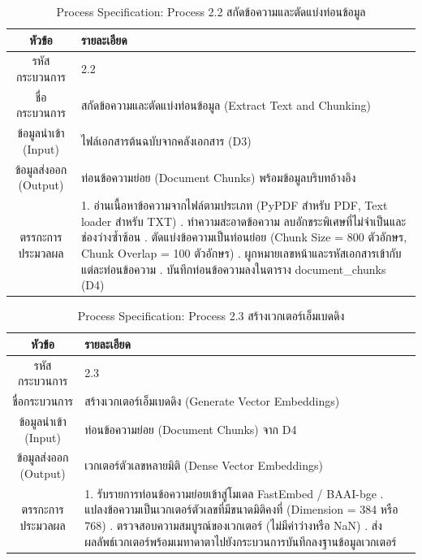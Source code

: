 \begin{table}[htbp]
\centering
\caption{Process Specification: Process 2.2 สกัดข้อความและตัดแบ่งท่อนข้อมูล}
\label{tab3:pspec2_2}
\begin{tabularx}{\textwidth}{| c | L |}
\hline
\textbf{หัวข้อ} & \textbf{รายละเอียด} \\ \hline
รหัสกระบวนการ & 2.2 \\ \hline
ชื่อกระบวนการ & สกัดข้อความและตัดแบ่งท่อนข้อมูล (Extract Text and Chunking) \\ \hline
ข้อมูลนำเข้า (Input) & ไฟล์เอกสารต้นฉบับจากคลังเอกสาร (D3) \\ \hline
ข้อมูลส่งออก (Output) & ท่อนข้อความย่อย (Document Chunks) พร้อมข้อมูลบริบทอ้างอิง \\ \hline
ตรรกะการประมวลผล & 1. อ่านเนื้อหาข้อความจากไฟล์ตามประเภท (PyPDF สำหรับ PDF, Text loader สำหรับ TXT) . ทำความสะอาดข้อความ ลบอักขระพิเศษที่ไม่จำเป็นและช่องว่างซ้ำซ้อน . ตัดแบ่งข้อความเป็นท่อนย่อย (Chunk Size = 800 ตัวอักษร, Chunk Overlap = 100 ตัวอักษร) . ผูกหมายเลขหน้าและรหัสเอกสารเข้ากับแต่ละท่อนข้อความ . บันทึกท่อนข้อความลงในตาราง document\_chunks (D4) \\ \hline
\end{tabularx}
\end{table}

\begin{table}[htbp]
\centering
\caption{Process Specification: Process 2.3 สร้างเวกเตอร์เอ็มเบดดิง}
\label{tab3:pspec2_3}
\begin{tabularx}{\textwidth}{| c | L |}
\hline
\textbf{หัวข้อ} & \textbf{รายละเอียด} \\ \hline
รหัสกระบวนการ & 2.3 \\ \hline
ชื่อกระบวนการ & สร้างเวกเตอร์เอ็มเบดดิง (Generate Vector Embeddings) \\ \hline
ข้อมูลนำเข้า (Input) & ท่อนข้อความย่อย (Document Chunks) จาก D4 \\ \hline
ข้อมูลส่งออก (Output) & เวกเตอร์ตัวเลขหลายมิติ (Dense Vector Embeddings) \\ \hline
ตรรกะการประมวลผล & 1. รับรายการท่อนข้อความย่อยเข้าสู่โมเดล FastEmbed / BAAI-bge . แปลงข้อความเป็นเวกเตอร์ตัวเลขที่มีขนาดมิติคงที่ (Dimension = 384 หรือ 768) . ตรวจสอบความสมบูรณ์ของเวกเตอร์ (ไม่มีค่าว่างหรือ NaN) . ส่งผลลัพธ์เวกเตอร์พร้อมเมทาดาตาไปยังกระบวนการบันทึกลงฐานข้อมูลเวกเตอร์ \\ \hline
\end{tabularx}
\end{table}

